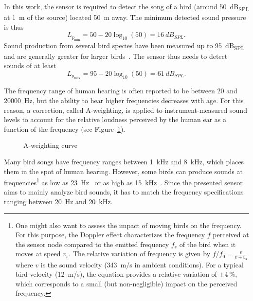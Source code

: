 \documentclass{EPL-master-thesis-covers-EN}
\newcommand{\te}[1]{\textrm{#1}}
\begin{document}
\begin{table}[H]
\centering
{}
\caption{Typical sound pressure levels}
\label{tab:sound_levels}
\end{table}

In this work, the sensor is required to detect the song of a bird (around \SI{50}{dB_{SPL}} at \SI{1}{m} of the source) located \SI{50}{m} away. The minimum detected sound pressure is thus
\[
 L_{p_\te{min}} = 50 - 20\log_{10}(50) = \SI{16}{dB_{SPL}}.
\]
Sound production from several bird species have been measured up to \SI{95}{dB_{SPL}} and are generally greater for larger birds~\cite{FHWA}. The sensor thus needs to detect sounds of at least
\[
 L_{p_\te{max}} = 95 - 20\log_{10}(50) = \SI{61}{dB_{SPL}}.
\]

The frequency range of human hearing is often reported to be between 20 and \SI{20000}{Hz}, but the ability to hear higher frequencies decreases with age. For this reason, a correction, called A-weighting, is applied to instrument-measured sound levels to account for the relative loudness perceived by the human ear as a function of the frequency (see Figure~\ref{fig:a_weighting}).

\begin{figure}[H]
    \centering
    
    \caption{A-weighting curve}
    \label{fig:a_weighting}
\end{figure}

Many bird songs have frequency ranges between \SI{1}{kHz} and \SI{8}{kHz}, which places them in the spot of human hearing. However, some birds can produce sounds at frequencies\footnote{One might also want to assess the impact of moving birds on the frequency. For this purpose, the Doppler effect characterizes the frequency $f$ perceived at the sensor node compared to the emitted frequency $f_s$ of the bird when it moves at speed $v_s$. The relative variation of frequency is given by $ f/f_0 = \frac{v}{v \pm v_\text{s}}$ where $v$ is the sound velocity (\SI{343}{m/s} in ambient conditions). For a typical bird velocity (\SI{12}{m/s}), the equation provides a relative variation of $\pm \SI{4}{\%}$, which corresponds to a small (but non-negligible) impact on the perceived frequency.} as low as \SI{23}{Hz}~\cite{10.2307/4090277} or as high as \SI{15}{kHz}~\cite{doi:10.1111/j.1474-919X.1962.tb08647.x}. Since the presented sensor aims to mainly analyze bird sounds, it has to match the frequency specifications ranging between \SI{20}{Hz} and \SI{20}{kHz}.
\end{document}
